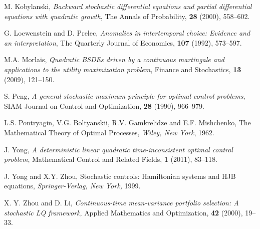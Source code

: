 \documentclass[final]{siamltex}
\begin{document}
\begin{thebibliography}{99}
{\sc M. Kobylanski}, {\it Backward stochastic differential equations and partial differential equations with quadratic growth}, {The Annals of Probability}, {\bf 28} (2000), 558--602.

{\sc G. Loewenstein  and D. Prelec}, {\it Anomalies in intertemporal choice: Evidence and an interpretation},
{The Quarterly Journal of Economics}, {\bf 107} (1992), 573--597.

{\sc M.A. Morlais}, {\it Quadratic BSDEs driven by a continuous martingale and applications to the utility maximization problem}, {Finance and Stochastics}, {\bf 13} (2009), 121--150.

 {\sc S. Peng}, {\it  A general stochastic maximum principle for optimal control problems},  {SIAM Journal on Control and Optimization},  {\bf 28}  (1990), 966--979.

 {\sc L.S. Pontryagin, V.G. Boltyanskii,  R.V. Gamkrelidze and E.F. Mishchenko},
The Mathematical Theory of Optimal Processes, {\it Wiley, New York}, 1962.

 {\sc J. Yong}, {\it A deterministic linear quadratic time-inconsistent optimal control problem}, Mathematical Control and Related Fields,
{\bf 1} (2011), 83--118.

 {\sc J. Yong and X.Y. Zhou}, Stochastic controls: Hamiltonian systems and HJB equations, {\it Springer-Verlag, New York,} 1999.

 {\sc X. Y. Zhou and D. Li}, {\it Continuous-time mean-variance portfolio selection: A stochastic LQ framework}, {Applied Mathematics and Optimization}, {\bf 42} (2000), 19--33.

\end{thebibliography}
\end{document}
